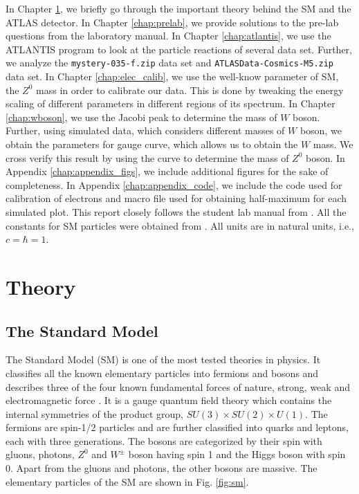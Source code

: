 \documentclass[a4paper]{report}
\numberwithin{equation}{section}
\begin{document}
In Chapter \ref{chap:theory}, we briefly go through the important theory behind the SM and the ATLAS detector. In Chapter \ref{chap:prelab}, we provide solutions to the pre-lab questions from the laboratory manual. In Chapter \ref{chap:atlantis}, we use the ATLANTIS program to look at the particle reactions of several data set. Further, we analyze the \texttt{mystery-035-f.zip} data set and \texttt{ATLASData-Cosmics-M5.zip} data set. In Chapter \ref{chap:elec_calib}, we use the well-know parameter of SM, the $Z^0$ mass in order to calibrate our data. This is done by tweaking the energy scaling of different parameters in different regions of its spectrum. In Chapter \ref{chap:wboson}, we use the Jacobi peak to determine the mass of $W$ boson. Further, using simulated data, which considers different masses of $W$ boson, we obtain the parameters for gauge curve, which allows us to obtain the $W$ mass. We cross verify this result by using the curve to determine the mass of $Z^0$ boson. In Appendix \ref{chap:appendix_figs}, we include additional figures for the sake of completeness. In Appendix \ref{chap:appendix_code}, we include the code used for calibration of electrons and macro file used for obtaining half-maximum for each simulated plot. This report closely follows the student lab manual from \cite{labman}. All the constants for SM particles were obtained from \cite{ParticleDataGroup:2020ssz}. All units are in natural units, i.e., $c = \hbar = 1$. 

\chapter{Theory} \label{chap:theory}

\section{The Standard Model}
The Standard Model (SM) is one of the most tested theories in physics. It classifies all the known elementary particles into fermions and bosons and describes three of the four known fundamental forces of nature, strong, weak and electromagnetic force \cite{ParticleDataGroup:2020ssz}. It is a gauge quantum field theory which contains the internal symmetries of the product group, $SU(3) \times SU(2) \times U(1)$. The fermions are spin-1/2 particles and are further classified into quarks and leptons, each with three generations. The bosons are categorized by their spin with gluons, photons, $Z^0$ and $W^{\pm}$ boson having spin 1 and the Higgs boson with spin 0. Apart from the gluons and photons, the other bosons are massive. The elementary particles of the SM are shown in Fig. \ref{fig:sm}.
\end{document}
